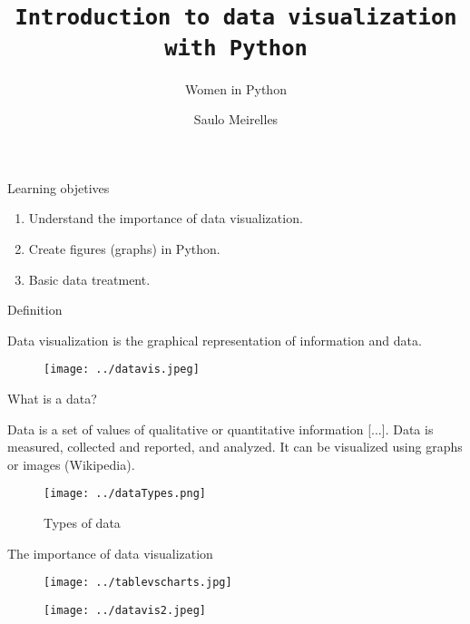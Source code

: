 \documentclass{beamer}
\title{\texttt{Introduction to \textbf{data visualization} with Python}}
\subtitle{Women in Python}
\author{Saulo Meirelles} %
\begin{document}
\begin{frame}
  \maketitle
\end{frame}

\begin{frame}{Learning objetives}

    \begin{enumerate}
    \item Understand the importance of data visualization.\pause
    \item Create figures (graphs) in Python.\pause
    \item Basic data treatment.\pause
    \end{enumerate}

\end{frame}

\begin{frame}{Definition}

\centering  
  Data visualization is the graphical representation of information and data. 

  \begin{figure}
  \texttt{[image: ../datavis.jpeg]}
  \end{figure}
  
\end{frame}

\begin{frame}{What is a data?}

Data is a set of values of qualitative or quantitative information [...]. Data is measured, collected and reported, and analyzed. It can be visualized using graphs or images (Wikipedia).

  \begin{figure}
  \texttt{[image: ../dataTypes.png]}
  \caption{Types of data}
  \end{figure}
  
\end{frame}


\begin{frame}{The importance of data visualization}

  \begin{figure}
  \texttt{[image: ../tablevscharts.jpg]}
  \end{figure}
  \begin{figure}
  \texttt{[image: ../datavis2.jpeg]}
  \end{figure}

\end{frame}
\end{document}
